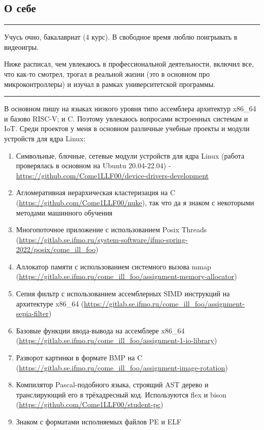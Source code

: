 \documentclass[10pt, final, twoside]{article}
\begin{document}
  \subsection*{\textcolor{darkgray2}{О себе}}
  \vspace*{-5.5mm}
  \par\noindent\rule{\textwidth}{0.1pt}
  
Учусь очно, бакалавриат (4 курс). В свободное время люблю поигрывать в видеоигры.

Ниже расписал, чем увлекаюсь в профессиональной деятельности, включил все, что как-то смотрел, трогал в реальной жизни (это в основном про микроконтроллеры) и изучал в рамках университетской программы.

\par\noindent\rule{\textwidth}{0.1pt}

В основном пишу на языках низкого уровня типо ассемблера архитектур x86\_64 и базово RISC-V; и C. Поэтому увлекаюсь вопросами встроенных системам и IoT. Среди проектов у меня в основном различные учебные проекты и модули устройств для ядра Linux:
\begin{enumerate}
  \item Символьные, блочные, сетевые модули устройств для ядра Linux (работа проверялась в основном на Ubuntu 20.04-22.04) - \url{https://github.com/Come1LLF00/device-drivers-development}
  \item Агломеративная иерархическая кластеризация на C (\url{https://github.com/Come1LLF00/nuke}), так что да я знаком с некоторыми методами машинного обучения
  \item Многопоточное приложение с использованием Posix Threads (\url{https://gitlab.se.ifmo.ru/system-software/ifmo-spring-2022/posix/come_ill_foo})
  \item Аллокатор памяти с использованием системного вызова mmap (\url{https://gitlab.se.ifmo.ru/come_ill_foo/assignment-memory-allocator})
  \item Сепия фильтр с использованием ассемблерных SIMD инструкций на архитектуре x86\_64 (\url{https://gitlab.se.ifmo.ru/come_ill_foo/assignment-sepia-filter})
  \item Базовые функции ввода-вывода на ассемблере x86\_64 (\url{https://gitlab.se.ifmo.ru/come_ill_foo/assignment-1-io-library})
  \item Разворот картинки в формате BMP на C (\url{https://gitlab.se.ifmo.ru/come_ill_foo/assignment-image-rotation})
  \item Компилятор Pascal-подобного языка, строящий AST дерево и транслирующий его в трёхадресный код. Используются flex и bison (\url{https://github.com/Come1LLF00/student-pc})
  \item Знаком с форматами исполняемых файлов PE и ELF
\end{enumerate}
\end{document}

